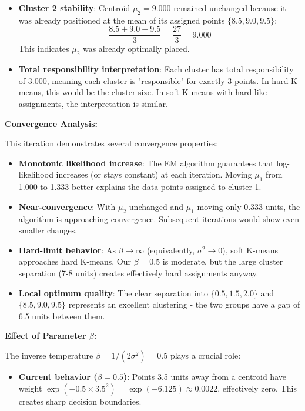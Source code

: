 \documentclass[12pt]{article}
\begin{document}
\begin{explanation}
\begin{itemize}
    \item \textbf{Cluster 2 stability}: Centroid $\mu_2 = 9.000$ remained unchanged because it was already positioned at the mean of its assigned points $\{8.5, 9.0, 9.5\}$:
    \[
    \frac{8.5 + 9.0 + 9.5}{3} = \frac{27}{3} = 9.000
    \]
    This indicates $\mu_2$ was already optimally placed.

    \item \textbf{Total responsibility interpretation}: Each cluster has total responsibility of 3.000, meaning each cluster is "responsible" for exactly 3 points. In hard K-means, this would be the cluster size. In soft K-means with hard-like assignments, the interpretation is similar.
\end{itemize}

\textbf{Convergence Analysis:}

This iteration demonstrates several convergence properties:

\begin{itemize}
    \item \textbf{Monotonic likelihood increase}: The EM algorithm guarantees that log-likelihood increases (or stays constant) at each iteration. Moving $\mu_1$ from 1.000 to 1.333 better explains the data points assigned to cluster 1.

    \item \textbf{Near-convergence}: With $\mu_2$ unchanged and $\mu_1$ moving only 0.333 units, the algorithm is approaching convergence. Subsequent iterations would show even smaller changes.

    \item \textbf{Hard-limit behavior}: As $\beta \to \infty$ (equivalently, $\sigma^2 \to 0$), soft K-means approaches hard K-means. Our $\beta = 0.5$ is moderate, but the large cluster separation (7-8 units) creates effectively hard assignments anyway.

    \item \textbf{Local optimum quality}: The clear separation into $\{0.5, 1.5, 2.0\}$ and $\{8.5, 9.0, 9.5\}$ represents an excellent clustering - the two groups have a gap of 6.5 units between them.
\end{itemize}

\textbf{Effect of Parameter $\beta$:}

The inverse temperature $\beta = 1/(2\sigma^2) = 0.5$ plays a crucial role:

\begin{itemize}
    \item \textbf{Current behavior ($\beta = 0.5$)}: Points 3.5 units away from a centroid have weight $\exp(-0.5 \times 3.5^2) = \exp(-6.125) \approx 0.0022$, effectively zero. This creates sharp decision boundaries.


\end{itemize}
\end{explanation}
\end{document}
